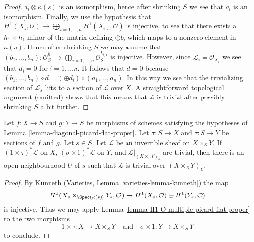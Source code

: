 \begin{proof}
$a_i \otimes \kappa(s)$ is an isomorphism, hence after shrinking $S$
we see that $a_i$ is an isomorphism. Finally, we use the hypothesis
that $H^1(X_s, \mathcal{O}) \to
\bigoplus_{i = 1, \ldots, n} H^1(X_{i, s}, \mathcal{O})$
is injective, to see that there exists a $h_1 \times h_1$ minor of the
matrix defining $\oplus b_i$ which maps to a nonzero
element in $\kappa(s)$. Hence after shrinking $S$ we may assume that
$(b_1, \ldots, b_n) : \mathcal{O}_S^{h_1}
\to \bigoplus_{i = 1, \ldots, n} \mathcal{O}_S^{h_{i, 1}}$
is injective. However, since $\mathcal{L}_i = \mathcal{O}_{X_i}$
we see that $d_i = 0$ for $i = 1, \ldots n$. It follows that $d = 0$
because $(b_1, \ldots, b_n) \circ d = (\oplus d_i) \circ (a_1, \ldots, a_n)$.
In this way we see
that the trivializing section of $\mathcal{L}_s$ lifts to a section
of $\mathcal{L}$ over $X$. A straightforward topological argument (omitted)
shows that this means that $\mathcal{L}$ is trivial after possibly
shrinking $S$ a bit further.
\end{proof}

\begin{lemma}
\label{lemma-pic-of-product}
Let $f : X \to S$ and $g : Y \to S$ be morphisms of schemes
satisfying the hypotheses of Lemma \ref{lemma-diagonal-picard-flat-proper}.
Let $\sigma : S \to X$ and $\tau : S \to Y$ be sections of
$f$ and $g$. Let $s \in S$.
Let $\mathcal{L}$ be an invertible sheaf on $X \times_S Y$.
If $(1 \times \tau)^*\mathcal{L}$ on $X$, $(\sigma \times 1)^*\mathcal{L}$
on $Y$, and $\mathcal{L}|_{(X \times_S Y)_s}$ are trivial, then
there is an open neighbourhood $U$ of $s$ such that
$\mathcal{L}$ is trivial over $(X \times_S Y)_U$.
\end{lemma}

\begin{proof}
By K\"unneth (Varieties, Lemma \ref{varieties-lemma-kunneth})
the map
$$
H^1(X_s \times_{\Spec(\kappa(s))} Y_s, \mathcal{O}) \to
H^1(X_s, \mathcal{O}) \oplus H^1(Y_s, \mathcal{O})
$$
is injective. Thus we may
apply Lemma \ref{lemma-H1-O-multiple-picard-flat-proper}
to the two morphisms
$$
1 \times \tau : X \to X \times_S Y
\quad\text{and}\quad
\sigma \times 1 : Y \to X \times_S Y
$$
to conclude.
\end{proof}

